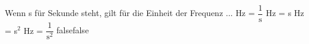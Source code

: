     {Wenn s für Sekunde steht, gilt für die Einheit der Frequenz ...}
    {Hz = $\dfrac{1}{\textrm{s}}$}
    {Hz = s}
    {Hz = s$^2$}
    {Hz = $\dfrac{1}{\textrm{s}^2}$}
    {false}{false}